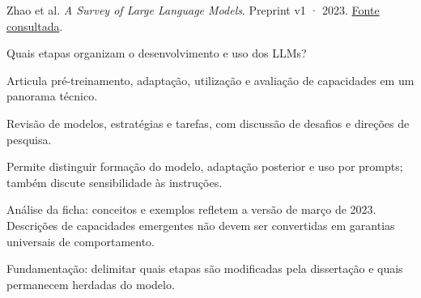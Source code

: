 {\small Zhao et al. \textit{A Survey of Large Language Models}. Preprint v1 · 2023. \href{https://arxiv.org/pdf/2303.18223v1}{Fonte consultada}.\par}

Quais etapas organizam o desenvolvimento e uso dos LLMs?

Articula pré-treinamento, adaptação, utilização e avaliação de capacidades em um panorama técnico.

Revisão de modelos, estratégias e tarefas, com discussão de desafios e direções de pesquisa.

Permite distinguir formação do modelo, adaptação posterior e uso por prompts; também discute sensibilidade às instruções.

\begin{itemize}
\end{itemize}

Análise da ficha: conceitos e exemplos refletem a versão de março de 2023. Descrições de capacidades emergentes não devem ser convertidas em garantias universais de comportamento.

Fundamentação: delimitar quais etapas são modificadas pela dissertação e quais permanecem herdadas do modelo.

